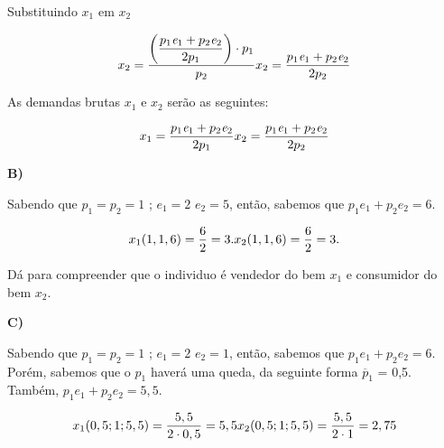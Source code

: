 \documentclass[a4paper, 12pt]{article} %
\begin{document}
\begin{flushleft}
\begin{center}
	Substituindo $x_{1}$ em $x_{2}$
\end{center}

\begin{equation}
x_{2} = \dfrac{\left( \dfrac{p_{1}\textit{e}_{1} + p_{2}\textit{e}_{2}}{2p_{1}}\right)\cdot p_{1}}{p_{2}}
$$\\$$
x_{2} = \dfrac{p_{1}\textit{e}_{1} + p_{2}\textit{e}_{2}}{2p_{2}}
\end{equation}

\begin{center}
	As demandas brutas $x_{1}$ e $x_{2}$ serão as seguintes:
\end{center}

\begin{equation}
x_{1} = \dfrac{p_{1}\textit{e}_{1} + p_{2}\textit{e}_{2}}{2p_{1}}
$$\\$$
x_{2} = \dfrac{p_{1}\textit{e}_{1} + p_{2}\textit{e}_{2}}{2p_{2}}
\end{equation}

\singlespacing

\textbf{B)}

Sabendo que $p_{1} = p_{2} = 1$ ; $\textit{e}_{1} = 2$  $\textit{e}_{2} = 5$, então, sabemos que $p_{1}\textit{e}_{1} + p_{2}\textit{e}_{2} = 6$.

\begin{equation}
x_{1}(1,1,6) = \dfrac{6}{2} = 3.
$$\\$$
x_{2}(1,1,6) = \dfrac{6}{2} = 3.
\end{equation}

\begin{center}
	Dá para compreender que o individuo é vendedor do bem $x_{1}$ e consumidor do bem $x_{2}$.
\end{center}

\singlespacing

\textbf{C)}

Sabendo que $p_{1} = p_{2} = 1$ ; $\textit{e}_{1} = 2$  $\textit{e}_{2} = 1$, então, sabemos que $p_{1}\textit{e}_{1} + p_{2}\textit{e}_{2} = 6$. Porém, sabemos que o $p_{1}$ haverá uma queda, da seguinte forma $\overline{p}_{1}$ = 0,5. Também, $p_{1}\textit{e}_{1} + p_{2}\textit{e}_{2} = 5,5$.

\begin{equation}
x_{1}(0,5;1;5,5) = \dfrac{5,5}{2 \cdot 0,5} = 5,5
$$\\$$
x_{2}(0,5;1;5,5) = \dfrac{5,5}{2 \cdot 1} = 2,75
\end{equation}


\end{flushleft}
\end{document}
